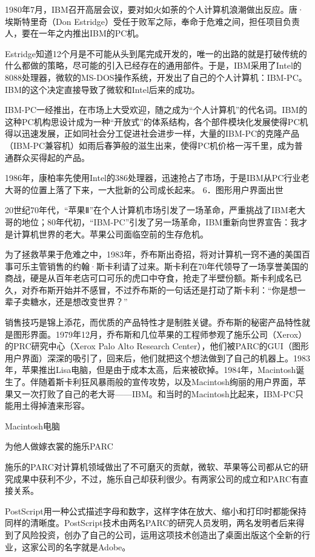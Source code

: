 \documentclass[12pt,UTF8]{ctexbook}
\begin{document}
1980年7月，IBM召开高层会议，要对如火如荼的个人计算机浪潮做出反应。唐·埃斯特里奇（Don Estridge）受任于败军之际，奉命于危难之间，担任项目负责人，要在一年之内推出IBM的PC机。

Estridge知道12个月是不可能从头到尾完成开发的，唯一的出路的就是打破传统的什么都做的策略，尽可能的引入已经存在的通用部件。于是，IBM采用了Intel的8088处理器，微软的MS-DOS操作系统，开发出了自己的个人计算机：IBM-PC。IBM的这个决定直接导致了微软和Intel后来的成功。

IBM-PC一经推出，在市场上大受欢迎，随之成为“个人计算机”的代名词。IBM的这种PC机构思设计成为一种“开放式”的体系结构，各个部件模块化发展使得PC机得以迅速发展，正如同社会分工促进社会进步一样，大量的IBM-PC的克隆产品（IBM-PC兼容机）如雨后春笋般的滋生出来，使得PC机价格一泻千里，成为普通群众买得起的产品。

1986年，康柏率先使用Intel的386处理器，迅速抢占了市场，于是IBM从PC行业老大哥的位置上落了下来，一大批新的公司成长起来。
6．图形用户界面出世

20世纪70年代，“苹果Ⅱ”在个人计算机市场引发了一场革命，严重挑战了IBM老大哥的地位；80年代初，“IBM-PC”引发了另一场革命，IBM重新向世界宣告：我才是计算机世界的老大。苹果公司面临空前的生存危机。

为了拯救苹果于危难之中，1983年，乔布斯出奇招，将对计算机一窍不通的美国百事可乐主管销售的约翰·斯卡利请了过来。斯卡利在70年代领导了一场享誉美国的商战，硬是从百年老店可口可乐的虎口中夺食，抢走了半壁份额。斯卡利成名已久，对乔布斯开始并不感冒，不过乔布斯的一句话还是打动了斯卡利：“你是想一辈子卖糖水，还是想改变世界？”

销售技巧是锦上添花，而优质的产品特性才是制胜关键。乔布斯的秘密产品特性就是图形界面。1979年12月，乔布斯和几位苹果的工程师参观了施乐公司（Xerox）的PRC研究中心（Xerox Palo Alto Research Center），他们被PARC的GUI（图形用户界面）深深的吸引了，回来后，他们就把这个想法做到了自己的机器上。1983年，苹果推出Lisa电脑，但是由于成本太高，后来被砍掉。1984年，Macintosh诞生了。伴随着斯卡利狂风暴雨般的宣传攻势，以及Macintosh绚丽的用户界面，苹果又一次打败了自己的老大哥——IBM。和当时的Macintosh比起来，IBM-PC只能用土得掉渣来形容。

Macintosh电脑

为他人做嫁衣裳的施乐PARC

施乐的PARC对计算机领域做出了不可磨灭的贡献，微软、苹果等公司都从它的研究成果中获利不少，不过，施乐自己却获利很少。有两家公司的成立和PARC有直接关系。

PostScript用一种公式描述字母和数字，这样字体在放大、缩小和打印时都能保持同样的清晰度。PostScript技术由两名PARC的研究人员发明，两名发明者后来得到了风险投资，创办了自己的公司，运用这项技术创造出了桌面出版这个全新的行业，这家公司的名字就是Adobe。
\end{document}
